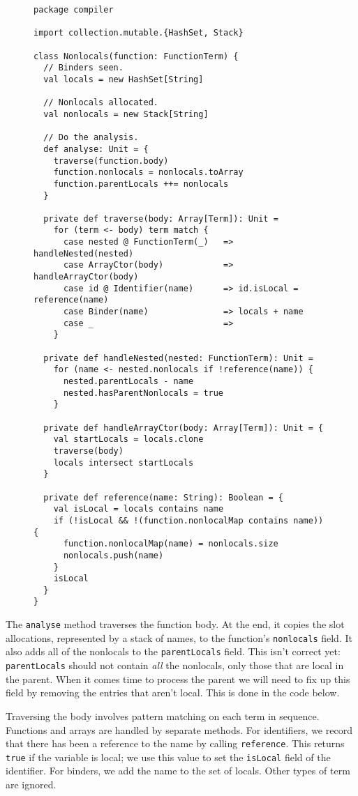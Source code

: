 \begin{figure}
\begin{verbatim}
package compiler

import collection.mutable.{HashSet, Stack}

class Nonlocals(function: FunctionTerm) {
  // Binders seen.
  val locals = new HashSet[String]

  // Nonlocals allocated.
  val nonlocals = new Stack[String]

  // Do the analysis.
  def analyse: Unit = {
    traverse(function.body)
    function.nonlocals = nonlocals.toArray
    function.parentLocals ++= nonlocals
  }

  private def traverse(body: Array[Term]): Unit =
    for (term <- body) term match {
      case nested @ FunctionTerm(_)   => handleNested(nested)
      case ArrayCtor(body)            => handleArrayCtor(body)
      case id @ Identifier(name)      => id.isLocal = reference(name)
      case Binder(name)               => locals + name
      case _                          =>
    }

  private def handleNested(nested: FunctionTerm): Unit =
    for (name <- nested.nonlocals if !reference(name)) {
      nested.parentLocals - name
      nested.hasParentNonlocals = true
    }

  private def handleArrayCtor(body: Array[Term]): Unit = {
    val startLocals = locals.clone
    traverse(body)
    locals intersect startLocals
  }

  private def reference(name: String): Boolean = {
    val isLocal = locals contains name
    if (!isLocal && !(function.nonlocalMap contains name)) {
      function.nonlocalMap(name) = nonlocals.size
      nonlocals.push(name)
    }
    isLocal
  }
}
\end{verbatim}
\getcaption
\end{figure}

The \verb!analyse! method traverses the function body.
At the end, it copies the slot allocations,
represented by a stack of names,
to the function's \verb!nonlocals! field.
It also adds all of the nonlocals to the \verb!parentLocals! field.
This isn't correct yet:
\verb!parentLocals! should not contain \emph{all} the nonlocals,
only those that are local in the parent.
When it comes time to process the parent we will need to fix up this field
by removing the entries that aren't local.
This is done in the code below.

Traversing the body involves pattern matching on each term in sequence.
Functions and arrays are handled by separate methods.
For identifiers,
we record that there has been a reference to the name
by calling \verb!reference!.
This returns \verb!true! if the variable is local;
we use this value to set the \verb!isLocal! field of the identifier.
For binders, we add the name to the set of locals.
Other types of term are ignored.

